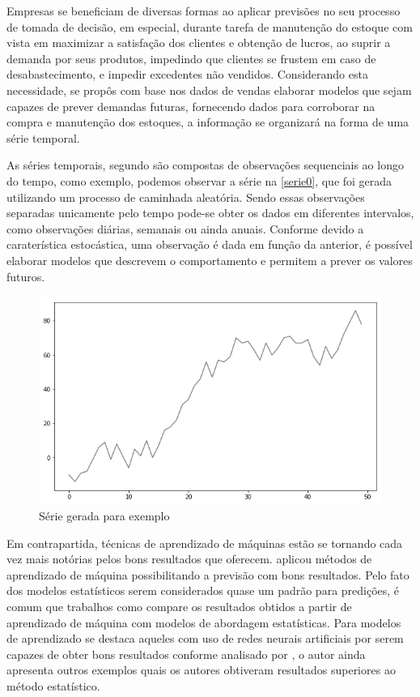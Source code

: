 \documentclass[
	12pt,
	oneside,
	a4paper,
	english,
	brazil
]{abntex2}
\begin{document}
Empresas se beneficiam de diversas formas ao aplicar previsões no seu processo 
de tomada de decisão, em especial, durante tarefa de manutenção do estoque com 
vista em maximizar a satisfação dos clientes e obtenção de lucros, ao suprir a 
demanda por seus produtos, impedindo que clientes se frustem em caso de 
desabastecimento, e impedir excedentes não vendidos. Considerando esta 
necessidade, se propôs com base nos dados de vendas elaborar modelos que sejam 
capazes de prever demandas futuras, fornecendo dados para corroborar na compra e 
manutenção dos estoques, a informação se organizará na forma de uma série 
temporal.

As séries temporais, segundo  são compostas de observações 
sequenciais ao longo do tempo, como exemplo, podemos observar a série na 
\autoref{serie0}, que foi gerada utilizando um processo de caminhada aleatória.  
Sendo essas observações separadas unicamente pelo tempo pode-se obter os dados 
em diferentes intervalos, como observações diárias, semanais ou ainda anuais.  
Conforme  devido a caraterística estocástica, uma observação 
é dada em função da anterior, é possível elaborar modelos que descrevem o 
comportamento e permitem a prever os valores futuros.

\begin{figure}[ht]
    \centering
    \caption{Série gerada para exemplo}\label{serie0}
    \includegraphics[width=.6\linewidth]{images/serie_exemplo.png}
\end{figure}


Em contrapartida, técnicas de aprendizado de máquinas estão se tornando cada vez 
mais notórias pelos bons resultados que oferecem.  aplicou 
métodos de aprendizado de máquina possibilitando a previsão com bons resultados.  
Pelo fato dos modelos estatísticos serem considerados quase um padrão para 
predições, é comum que trabalhos como  compare os 
resultados obtidos a partir de aprendizado de máquina com modelos de abordagem 
estatísticas. Para modelos de aprendizado se destaca aqueles com uso de redes 
neurais artificiais por serem capazes de obter bons resultados conforme 
analisado por , o autor ainda apresenta outros exemplos quais 
os autores obtiveram resultados superiores ao método estatístico.
\end{document}
